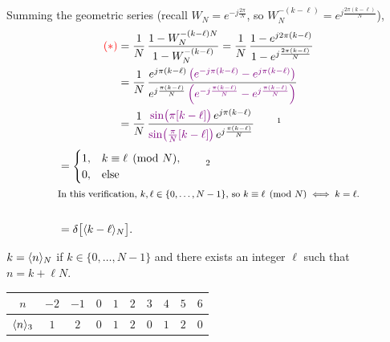 \documentclass[handout_subfiles_root.tex]{subfiles}
\begin{document}
Summing the geometric series (recall $W_N = e^{-j\frac{2\pi}{N}}$, so $W_N^{-(k-\ell)} = e^{j\frac{2\pi(k-\ell)}{N}}$),
\begin{align*}
\textcolor{red}{(\ast)} &= \frac{1}{N}\,\frac{1-W_N^{-(k-\ell)N}}{1-W_N^{-(k-\ell)}}
= \frac{1}{N}\,\frac{1-e^{j2\pi(k-\ell)}}{1-e^{j\frac{2\pi(k-\ell)}{N}}} \\
&= \frac{1}{N}\,\frac{e^{j\pi(k-\ell)}\,\textcolor{violet}{\left(e^{-j\pi(k-\ell)}-e^{j\pi(k-\ell)}\right)}}{e^{j\frac{\pi(k-\ell)}{N}}\,\textcolor{violet}{\left(e^{-j\frac{\pi(k-\ell)}{N}}-e^{j\frac{\pi(k-\ell)}{N}}\right)}} \\
&= \frac{1}{N}\,\frac{\textcolor{violet}{\sin\!\big(\pi[k-\ell]\big)}\,e^{j\pi(k-\ell)}}{\textcolor{violet}{\sin\!\big(\frac{\pi}{N}[k-\ell]\big)}\,e^{j\frac{\pi(k-\ell)}{N}}}\qquad\footnotemark{}
\end{align*}
%
\begin{align*}
&= \begin{cases} 1, & k \equiv \ell \pmod{N}, \\ 0, & \text{else} \end{cases}\qquad\footnotemark{} \\
\intertext{%
  \footnotesize In this verification, $k,\ell\in\{0,\ldots,N-1\}$, so $k\equiv\ell\pmod{N}\iff k=\ell$.%
}\\
&= \delta\big[\HandoutMod{k-\ell}{N}\big].
\end{align*}

\begin{defbox}[title={Modulo Operation $\HandoutMod{n}{N}$}]
$k = \langle n\rangle_{N}$ if $k\in\{0,\dots,N-1\}$ and there exists an integer $\ell$ such that $n = k + \ell N$.
\end{defbox}

\begin{examplebox}[title={Example $\HandoutMod{n}{3}$ {\normalfont\small\textit{(see Mitra~2.3.1)}}}]
\begin{center}
\renewcommand{\arraystretch}{1.2}
\begin{tabular}{c|ccccccccc}
$n$ & $-2$ & $-1$ & $0$ & $1$ & $2$ & $3$ & $4$ & $5$ & $6$ \\
\hline
$\HandoutMod{n}{3}$ & $1$ & $2$ & $0$ & $1$ & $2$ & $0$ & $1$ & $2$ & $0$
\end{tabular}
\end{center}
\end{examplebox}
\end{document}
